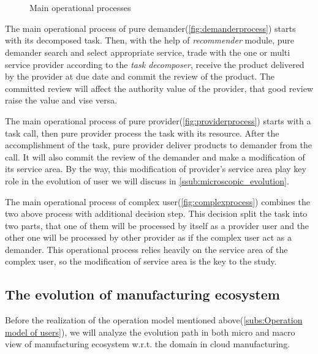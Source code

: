 \begin{figure}[htbp]
\centering
{}\\
\\
\caption{Main operational processes}
\label{fig:useroperation}
\end{figure}

The main operational process of pure demander(\autoref{fig:demanderprocess}) starts with its decomposed task. Then, with the help of \textit{recommender} module, pure demander search and select appropriate service, trade with the one or multi service provider according to the \textit{task decomposer}, receive the product delivered by the provider at due date and commit the review of the product. The committed review will affect the authority value of the provider, that good review raise the value and vise versa.

The main operational process of pure provider(\autoref{fig:providerprocess}) starts with a task call, then pure provider process the task with its resource. After the accomplishment of the task, pure provider deliver products to demander from the call. It will also commit the review of the demander and make a modification of its service area. By the way, this modification of provider's service area play key role in the evolution of user we will discuss in \autoref{ssub:microscopic_evolution}.  

The main operational process of complex user(\autoref{fig:complexprocess}) combines the two above process with additional decision step. This decision split the task into two parts, that one of them will be processed by itself as a provider user and the other one will be processed by other provider as if the complex user act as a demander. This operational process relies heavily on the service area of the complex user, so the modification of service area is the key to the study.

\subsection{The evolution of manufacturing ecosystem} %
\label{sub:the_evolution_of_manufacturing_ecosystem}
Before the realization of the operation model mentioned above(\autoref{subs:Operation model of users}), we will analyze the evolution path in both micro and macro view of manufacturing ecosystem w.r.t. the domain in cloud manufacturing. 

